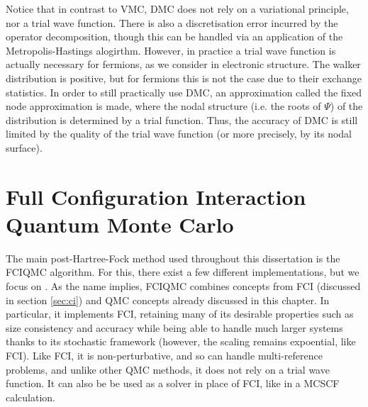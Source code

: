 Notice that in contrast to \gls{VMC}, \gls{DMC} does not rely on a variational principle, nor a trial wave function. There is also a discretisation error incurred by the operator decomposition, though this can be handled via an application of the Metropolis-Hastings alogirthm.\cite{thijssenComputational2007}
However, in practice a trial wave function is actually necessary for fermions, as we consider in electronic structure. The walker distribution is positive, but for fermions this is not the case due to their exchange statistics. In order to still practically use DMC, an approximation called the fixed node approximation is made, where the nodal structure (i.e. the roots of $\Psi$) of the distribution is determined by a trial function. Thus, the accuracy of DMC is still limited by the quality of the trial wave function (or more precisely, by its nodal surface).




\section{Full Configuration Interaction Quantum Monte Carlo}
\label{sec:fciqmc}

The main post-Hartree-Fock method used throughout this dissertation is the \gls{FCIQMC} algorithm. For this, there exist a few different implementations,\cite{Guther_neci_2020,spencerHANDEQMC2019b,brandRimujl2024,andersonRobertanderson2024} but we focus on \neci.\cite{Guther_neci_2020} As the name implies, \gls{FCIQMC} combines concepts from \gls{FCI} (discussed in section \ref{sec:ci}) and \gls{QMC} concepts already discussed in this chapter. In particular, it implements FCI, retaining many of its desirable properties such as size consistency and accuracy while being able to handle much larger systems thanks to its stochastic framework (however, the scaling remains expoential, like FCI). Like FCI, it is non-perturbative, and so can handle multi-reference problems, and unlike other QMC methods, it does not rely on a trial wave function. It can also be be used as a solver in place of FCI, like in a \gls{MCSCF} calculation.

